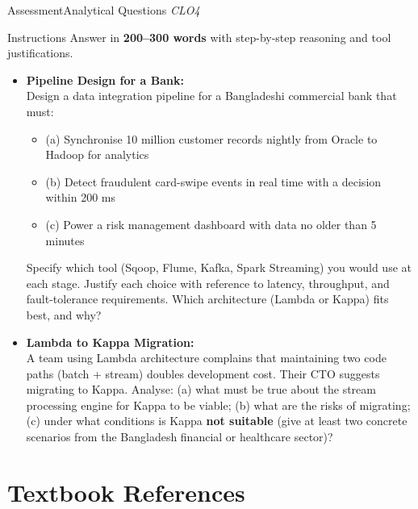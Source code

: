 \documentclass[aspectratio=169,10pt]{beamer}
\begin{document}
\begin{frame}{Assessment\textemdash Analytical Questions \hfill\small\textit{CLO4}}
  \begin{block}{Instructions}
    Answer in \textbf{200--300 words} with step-by-step reasoning and tool justifications.
  \end{block}
  \vspace{6pt}
  \begin{itemize}
    \item[\textbf{A1.}] \textbf{Pipeline Design for a Bank:}\\
    Design a data integration pipeline for a Bangladeshi commercial bank that must:
    \begin{itemize}
      \item (a) Synchronise 10 million customer records nightly from Oracle to Hadoop for analytics
      \item (b) Detect fraudulent card-swipe events in real time with a decision within 200 ms
      \item (c) Power a risk management dashboard with data no older than 5 minutes
    \end{itemize}
    Specify which tool (Sqoop, Flume, Kafka, Spark Streaming) you would use at each stage.  Justify each choice with reference to latency, throughput, and fault-tolerance requirements.  Which architecture (Lambda or Kappa) fits best, and why?
  \end{itemize}
  \vspace{6pt}
  \begin{itemize}
    \item[\textbf{A2.}] \textbf{Lambda to Kappa Migration:}\\
    A team using Lambda architecture complains that maintaining two code paths (batch + stream) doubles development cost.  Their CTO suggests migrating to Kappa.  Analyse: (a) what must be true about the stream processing engine for Kappa to be viable; (b) what are the risks of migrating; (c) under what conditions is Kappa \textbf{not suitable} (give at least two concrete scenarios from the Bangladesh financial or healthcare sector)?
  \end{itemize}
\end{frame}

\section*{Textbook References}
\end{document}
